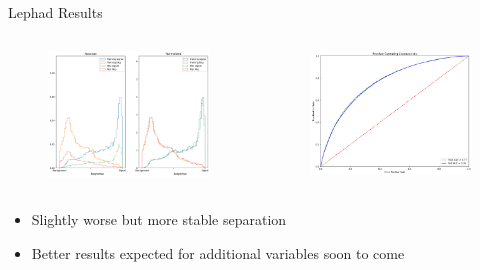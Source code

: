 \begin{frame}{Lephad Results}
\begin{columns}
  \begin{column}{0.5\textwidth}
    \begin{figure}
      \includegraphics[width=\textwidth]{Response_lephad.png}
    \end{figure}
  \end{column}
  \begin{column}{0.5\textwidth}
    \begin{figure}
      \includegraphics[width=\textwidth]{ROC_lephad.png}
    \end{figure}
  \end{column}
\end{columns}
%
\begin{itemize}
  \item Slightly worse but more stable separation
  \item Better results expected for additional variables soon to come
\end{itemize}
\end{frame}

